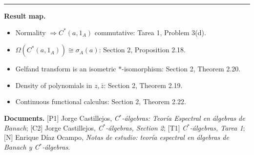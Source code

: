 \documentclass[11pt]{article}
\newcommand{\divider}{\vspace{0.2em}\noindent\rule{\textwidth}{1.25pt}\vspace{0.35em}}
\begin{document}
\divider

\textcolor{sourcegray}{\textbf{Result map.}}
\begin{itemize}[leftmargin=1.7em,itemsep=0.2em,topsep=0.2em]
\item \textcolor{sourcegray}{Normality $\Rightarrow C^*(a,1_A)$ commutative: Tarea 1, Problem 3(d).}
\item \textcolor{sourcegray}{$\Omega(C^*(a,1_A))\cong\sigma_A(a)$: Section 2, Proposition 2.18.}
\item \textcolor{sourcegray}{Gelfand transform is an isometric $*$-isomorphism: Section 2, Theorem 2.20.}
\item \textcolor{sourcegray}{Density of polynomials in $z,\bar z$: Section 2, Theorem 2.19.}
\item \textcolor{sourcegray}{Continuous functional calculus: Section 2, Theorem 2.22.}
\end{itemize}

\textcolor{sourcegray}{\textbf{Documents.} [P1] Jorge Castillejos, \emph{C$^*$-álgebras: Teoría Espectral en álgebras de Banach}; [C2] Jorge Castillejos, \emph{C$^*$-álgebras, Section 2}; [T1] \emph{C$^*$-álgebras, Tarea 1}; [N] Enrique Díaz Ocampo, \emph{Notas de estudio: teoría espectral en álgebras de Banach y C$^*$-álgebras}.}
\end{document}
